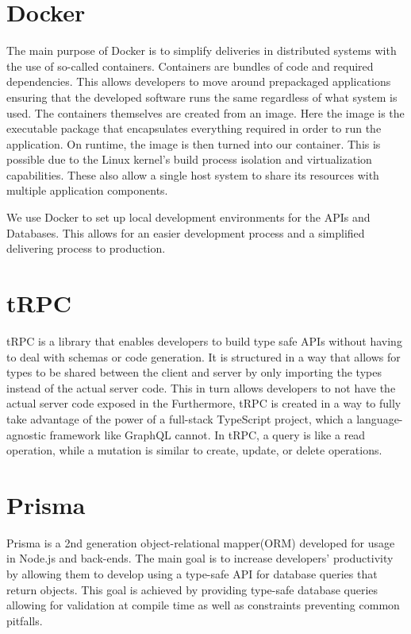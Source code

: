 \section*{Docker}
The main purpose of Docker is to simplify deliveries in distributed systems with the use of so-called containers\cite{Docker_Container}.
Containers are bundles of code and required dependencies. This allows developers to move around prepackaged applications ensuring that the developed software runs the same regardless of what system is used\cite{Docker_Container}.
The containers themselves are created from an image. Here the image is the executable package that encapsulates everything required in order to run the application. On runtime, the image is then turned into our container. 
This is possible due to the Linux kernel's build process isolation and virtualization capabilities. These also allow a single host system to share its resources with multiple application components\cite{Docker_Container}.

We use Docker to set up local development environments for the APIs and Databases. This allows for an easier development process and a simplified delivering process to production.

\section*{tRPC}
tRPC is a library that enables developers to build type safe APIs without having to deal with schemas or code generation. 
It is structured in a way that allows for types to be shared between the client and server by only importing the types instead of the actual server code. 
This in turn allows developers to not have the actual server code exposed in the \frontend{} 
Furthermore, tRPC is created in a way to fully take advantage of the power of a full-stack TypeScript project, which a language-agnostic framework like GraphQL cannot\cite{tRPC}.
In tRPC, a query is like a read operation, while a mutation is similar to create, update, or delete operations.

\section*{Prisma}
Prisma is a 2nd generation object-relational mapper(ORM) developed for usage in Node.js and \typescript{} back-ends. 
The main goal is to increase developers' productivity by allowing them to develop using a type-safe API for database queries that return \javascript{} objects. 
This goal is achieved by providing type-safe database queries allowing for validation at compile time as well as constraints preventing common pitfalls\cite{Prisma_Why}.

